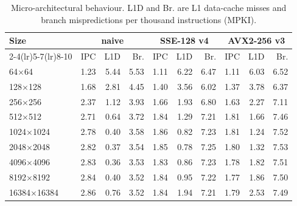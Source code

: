 \begin{table}[htbp]
\centering
\small
\caption{Micro-architectural behaviour. L1D and Br. are L1 data-cache misses and branch mispredictions per thousand instructions (MPKI).}
\label{tab:simd-micro}
\begin{tabular}{lrrrrrrrrr}
\toprule
Size & \multicolumn{3}{c}{naive} & \multicolumn{3}{c}{SSE-128 v4} & \multicolumn{3}{c}{AVX2-256 v3} \\
\cmidrule(lr){2-4}\cmidrule(lr){5-7}\cmidrule(lr){8-10}
 & IPC & L1D & Br. & IPC & L1D & Br. & IPC & L1D & Br. \\
\midrule
64$\times$64 & 1.23 & 5.44 & 5.53 & 1.11 & 6.22 & 6.47 & 1.11 & 6.03 & 6.52 \\
128$\times$128 & 1.68 & 2.81 & 4.45 & 1.40 & 3.56 & 6.02 & 1.37 & 3.78 & 6.37 \\
256$\times$256 & 2.37 & 1.12 & 3.93 & 1.66 & 1.93 & 6.80 & 1.63 & 2.27 & 7.11 \\
512$\times$512 & 2.71 & 0.64 & 3.72 & 1.84 & 1.29 & 7.21 & 1.81 & 1.66 & 7.46 \\
1024$\times$1024 & 2.78 & 0.40 & 3.58 & 1.86 & 0.82 & 7.23 & 1.81 & 1.24 & 7.52 \\
2048$\times$2048 & 2.82 & 0.37 & 3.54 & 1.85 & 0.78 & 7.25 & 1.80 & 1.32 & 7.53 \\
4096$\times$4096 & 2.83 & 0.36 & 3.53 & 1.83 & 0.86 & 7.23 & 1.78 & 1.82 & 7.51 \\
8192$\times$8192 & 2.84 & 0.40 & 3.52 & 1.84 & 0.95 & 7.22 & 1.77 & 1.86 & 7.50 \\
16384$\times$16384 & 2.86 & 0.76 & 3.52 & 1.84 & 1.94 & 7.21 & 1.79 & 2.53 & 7.49 \\
\bottomrule
\end{tabular}
\end{table}
